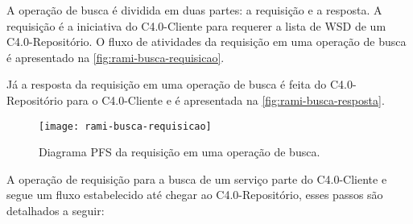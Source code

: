 	A operação de busca é dividida em duas partes: a requisição e a resposta. A requisição é a iniciativa do C4.0-Cliente para requerer a lista de WSD de um C4.0-Repositório. O fluxo de atividades da requisição em uma operação de busca é apresentado na \autoref{fig:rami-busca-requisicao}.
	
	Já a resposta da requisição em uma operação de busca é feita do C4.0-Repositório para o C4.0-Cliente e é apresentada na \autoref{fig:rami-busca-resposta}.
	
	\begin{figure}[htb]
		\centering
		\caption{Diagrama PFS da requisição em uma operação de busca.}
		\label{fig:rami-busca-requisicao}
		\texttt{[image: rami-busca-requisicao]}
	\end{figure}

	A operação de requisição para a busca de um serviço parte do C4.0-Cliente e segue um fluxo estabelecido até chegar ao C4.0-Repositório, esses passos são detalhados a seguir:
	
